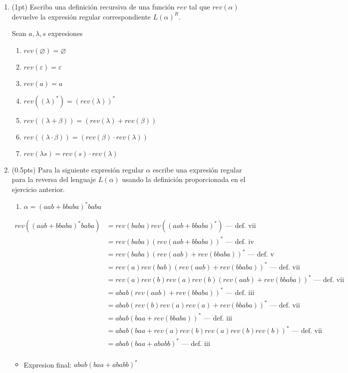 \documentclass{article}
\begin{document}
\begin{enumerate}
    \item (1pt) Escriba una definición recursiva de una función $rev$ tal que $rev(\alpha)$ devuelve la expresión regular correspondiente $L(\alpha)^R$.
    
    Sean $a,\lambda, s$ expresiones
    \begin{enumerate}[label=\roman*.]
        \item $rev(\varnothing) = \varnothing$
        \item $rev(\varepsilon) = \varepsilon$
        \item $rev(a) = a$
        \item $rev((\lambda)^*) = (rev(\lambda))^*$
        \item $rev((\lambda + \beta)) = (rev(\lambda) + rev(\beta))$
        \item $rev((\lambda \cdot \beta)) = (rev(\beta) \cdot rev(\lambda))$
        \item $rev(\lambda s) = rev(s) \cdot rev(\lambda)$
    \end{enumerate}
    
    \item (0.5pts) Para la siguiente expresión regular $\alpha$ escribe una expresión regular para la reversa del lenguaje $L(\alpha)$ usando la definición proporcionada en el ejercicio anterior.
    \begin{enumerate}[label=\alph*)]
        \item $\alpha = (aab + bbaba)^*baba$
    \end{enumerate}
    \begin{align*}
        rev((aab + bbaba)^*baba)&= rev(baba)rev((aab + bbaba)^*) \mbox{ --- def. vii}\\
          &= rev(baba)(rev(aab + bbaba))^* \mbox{ --- def. iv} \\
          &= rev(baba)(rev(aab) + rev(bbaba))^* \mbox{ --- def. v} \\
          &= rev(a)rev(bab)(rev(aab) + rev(bbaba))^* \mbox{ --- def. vii} \\
          &= rev(a)rev(b)rev(a)rev(b)(rev(aab) + rev(bbaba))^* \mbox{ --- def. vii} \\
          &= abab(rev(aab) + rev(bbaba))^* \mbox{ --- def. iii} \\
          &= abab(rev(b)rev(a)rev(a) + rev(bbaba))^* \mbox{ --- def. vii} \\
          &= abab(baa + rev(bbaba))^* \mbox{ --- def. iii} \\
          &= abab(baa + rev(a)rev(b)rev(a)rev(b)rev(b))^* \mbox{ --- def. vii} \\
          &= abab(baa + ababb)^* \mbox{ --- def. iii} \\
    \end{align*}
    \begin{itemize}
        \item Expresion final: $\boxed{abab(baa + ababb)^*}$
    \end{itemize}
    

\end{enumerate}
\end{document}

